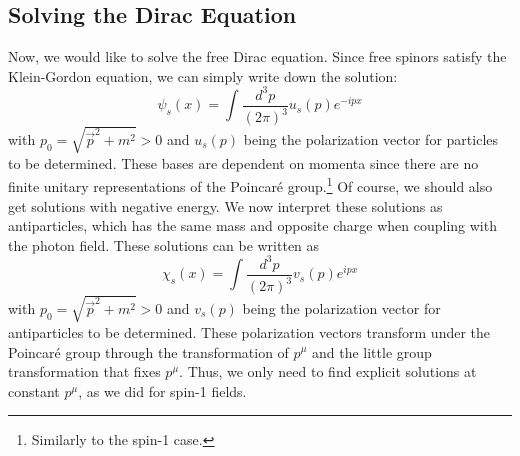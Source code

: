 \documentclass[11pt]{article}
\theoremstyle{definition}
\begin{document}
\subsection{Solving the Dirac Equation}
Now, we would like to solve the free Dirac equation. Since free spinors satisfy the Klein-Gordon equation, we can simply write down the solution:
\begin{equation}
    \psi_s(x) = \int \frac{d^3p}{(2\pi)^3} u_s(p)e^{-ipx}
\end{equation}
with $p_0 = \sqrt{\vec{p}^2 + m^2} > 0$ and $u_s(p)$ being the polarization vector for particles to be determined. These bases are dependent on momenta since there are no finite unitary representations of the Poincaré group.\footnote{Similarly to the spin-1 case.} Of course, we should also get solutions with negative energy. We now interpret these solutions as antiparticles, which has the same mass and opposite charge when coupling with the photon field. These solutions can be written as 
\begin{equation}
    \chi_s(x) = \int \frac{d^3p}{(2\pi)^3} v_s(p)e^{ipx}
\end{equation}
with $p_0 = \sqrt{\vec{p}^2 + m^2} > 0$ and $v_s(p)$ being the polarization vector for antiparticles to be determined. These polarization vectors transform under the Poincaré group through the transformation of $p^\mu$ and the little group transformation that fixes $p^\mu$. Thus, we only need to find explicit solutions at constant $p^\mu$, as we did for spin-1 fields.
\end{document}

